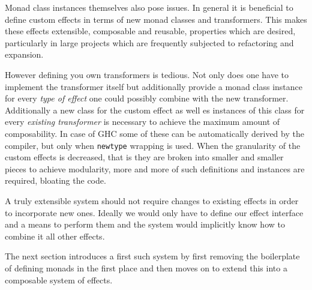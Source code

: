 Monad class instances themselves also pose issues. In general it is beneficial
to define custom effects in terms of new monad classes and transformers. This
makes these effects extensible, composable and reusable, properties which are
desired, particularly in large projects which are frequently subjected to
refactoring and expansion.

However defining you own transformers is tedious. Not only does one have to
implement the transformer itself but additionally provide a monad class instance
for every \emph{type of effect} one could possibly combine with the new
transformer. Additionally a new class for the custom effect as well es instances
of this class for every \emph{existing transformer} is necessary to achieve the
maximum amount of composability. In case of GHC some of these can be
automatically derived by the compiler, but only when \texttt{newtype} wrapping
is used. When the granularity of the custom effects is decreased, that is they
are broken into smaller and smaller pieces to achieve modularity, more and more
of such definitions and instances are required, bloating the code.

A truly extensible system should not require changes to existing effects in
order to incorporate new ones. Ideally we would only have to define our effect
interface and a means to perform them and the system would implicitly know how
to combine it all other effects.

The next section introduces a first such system by first removing the
boilerplate of defining monads in the first place and then moves on to extend
this into a composable system of effects.
